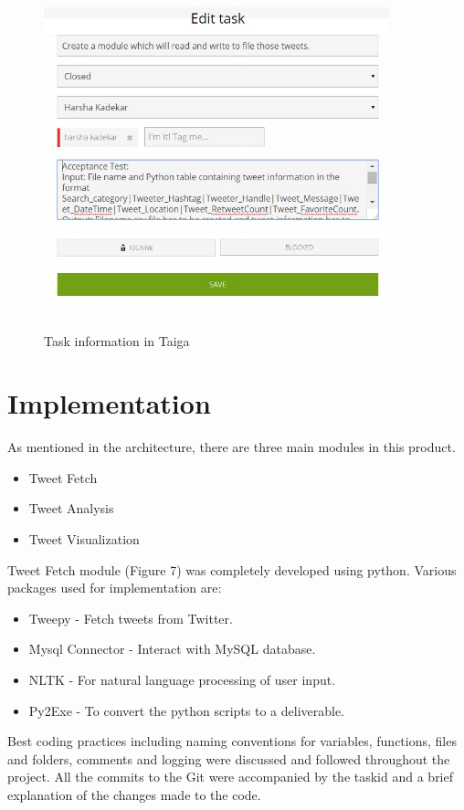 \documentclass[11pt]{article}
\begin{document}
\begin{figure}[!ht]
\centering
\includegraphics[width=10cm, height=10cm]{TaskInfo.jpg}
\caption{Task information in Taiga\cite{TaigaSite} }
\end{figure}


\section{Implementation}
As mentioned in the architecture, there are three main modules in this product.
\begin{itemize}
\item Tweet Fetch
\item Tweet Analysis
\item Tweet Visualization
\end{itemize}

Tweet Fetch module (Figure 7) was completely developed using python. Various packages used for implementation are:
\begin{itemize}
\item Tweepy - Fetch tweets from Twitter.
\item Mysql Connector - Interact with MySQL database.
\item NLTK - For natural language processing of user input.
\item Py2Exe - To convert the python scripts to a deliverable.
\end{itemize}

Best coding practices including naming conventions for variables, functions, files and folders, comments and logging were discussed and followed throughout the project. All the commits to the Git were accompanied by the taskid and a brief explanation of the changes made to the code.
\end{document}
